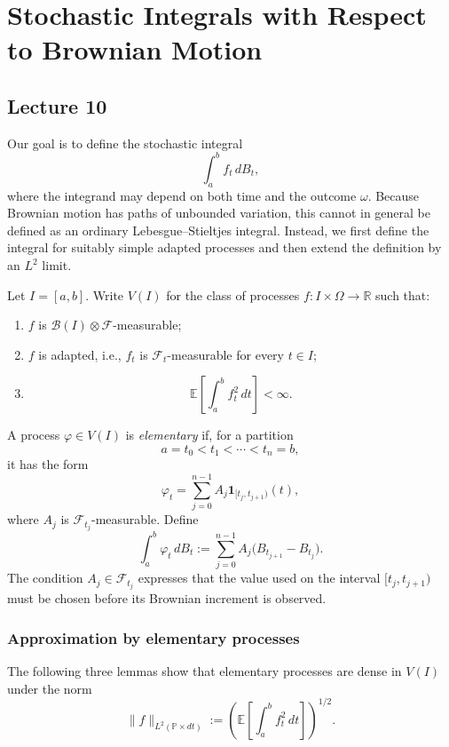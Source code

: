 \chapter{Stochastic Integrals with Respect to Brownian Motion}
\section{Lecture 10}

Our goal is to define the stochastic integral
\[
  \int_a^b f_t\,dB_t,
\]
where the integrand may depend on both time and the outcome $\omega$.
Because Brownian motion has paths of unbounded variation, this cannot in
general be defined as an ordinary Lebesgue--Stieltjes integral. Instead, we
first define the integral for suitably simple adapted processes and then
extend the definition by an $L^2$ limit.

\begin{definition}
Let $I=[a,b]$. Write $V(I)$ for the class of processes
$f:I\times\Omega\to\mathbb{R}$ such that:
\begin{enumerate}
  \item $f$ is $\mathcal{B}(I)\otimes\mathcal{F}$-measurable;
  \item $f$ is adapted, i.e., $f_t$ is $\mathcal{F}_t$-measurable for every
  $t\in I$;
  \item
  \[
    \mathbb{E}\left[\int_a^b f_t^2\,dt\right]<\infty.
  \]
\end{enumerate}
\end{definition}

\begin{definition}
A process $\varphi\in V(I)$ is \emph{elementary} if, for a partition
\[
  a=t_0<t_1<\cdots<t_n=b,
\]
it has the form
\[
  \varphi_t=\sum_{j=0}^{n-1}A_j\mathbf{1}_{[t_j,t_{j+1})}(t),
\]
where $A_j$ is $\mathcal{F}_{t_j}$-measurable. Define
\[
  \int_a^b\varphi_t\,dB_t
  :=\sum_{j=0}^{n-1}A_j\bigl(B_{t_{j+1}}-B_{t_j}\bigr).
\]
The condition $A_j\in\mathcal{F}_{t_j}$ expresses that the value used on
the interval $[t_j,t_{j+1})$ must be chosen before its Brownian increment is
observed.
\end{definition}

\subsection*{Approximation by elementary processes}
The following three lemmas show that elementary processes are dense in $V(I)$
under the norm
\[
  \|f\|_{L^2(\mathbb{P}\times dt)}
  :=\left(\mathbb{E}\left[\int_a^b f_t^2\,dt\right]\right)^{1/2}.
\]

